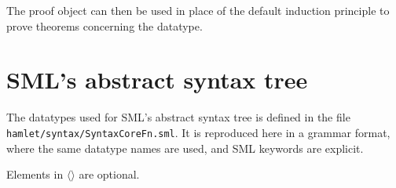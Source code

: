 \documentclass[a4paper,11pt]{article}
\newtheorem{theorem}{Theorem}
\newcommand{\gr}[1]{\todo[linecolor=Plum,backgroundcolor=Plum!25,bordercolor=Plum]{G: #1}}
\newcommand\stog{\boldsymbol{\Longrightarrow}}
\begin{document}
\vspace{10pt}
The proof object can then be used in place of the default induction principle to prove theorems concerning the datatype.

%  
%  
%  
%  
%  

\appendix

\section{SML's abstract syntax tree}

The datatypes used for SML's abstract syntax tree is defined in the file
\texttt{hamlet/syntax/SyntaxCoreFn.sml}. It is reproduced here in a grammar
format, where the same datatype names are used, and SML keywords are explicit.

Elements in $\langle\rangle$ are optional.
\end{document}
